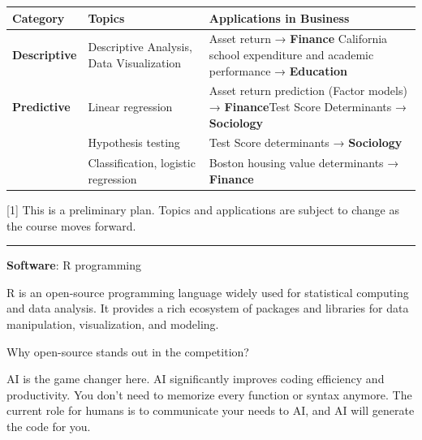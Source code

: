 \documentclass[
  12pt,
  a4paper,
]{scrbook}
\newcounter{none} %
\theoremstyle{plain}
\theoremstyle{definition}
\theoremstyle{remark}
\begin{document}
{\def\LTcaptype{none} %
\begin{longtable}[]{@{}
  >{\raggedright\arraybackslash}p{}
  >{\raggedright\arraybackslash}p{}
  >{\raggedright\arraybackslash}p{}@{}}
\toprule\noalign{}
\begin{minipage}[b]{\linewidth}\raggedright
\textbf{Category}
\end{minipage} & \begin{minipage}[b]{\linewidth}\raggedright
\textbf{Topics}
\end{minipage} & \begin{minipage}[b]{\linewidth}\raggedright
\textbf{Applications in Business}
\end{minipage} \\
\midrule\noalign{}
\endhead
\bottomrule\noalign{}
\endlastfoot
\textbf{Descriptive} & Descriptive Analysis, Data Visualization & Asset
return → \textbf{Finance} California school expenditure and academic
performance → \textbf{Education} \\
\textbf{Predictive} & Linear regression & Asset return prediction
(Factor models) → \textbf{Finance}Test Score Determinants →
\textbf{Sociology} \\
& Hypothesis testing & Test Score determinants → \textbf{Sociology} \\
& Classification, logistic regression & Boston housing value
determinants → \textbf{Finance} \\
\end{longtable}
}

{[}1{]} This is a preliminary plan. Topics and applications are subject
to change as the course moves forward.

\begin{center}\rule{0.5\linewidth}{0.5pt}\end{center}

\textbf{Software}: R programming

R is an open-source programming language widely used for statistical
computing and data analysis. It provides a rich ecosystem of packages
and libraries for data manipulation, visualization, and modeling.

Why open-source stands out in the competition?

AI is the game changer here. AI significantly improves coding efficiency
and productivity. You don't need to memorize every function or syntax
anymore. The current role for humans is to communicate your needs to AI,
and AI will generate the code for you.
\end{document}
